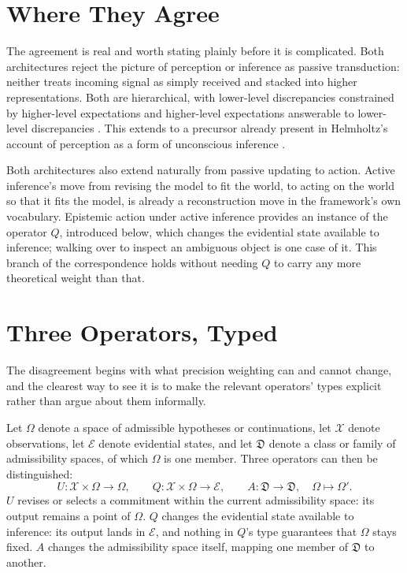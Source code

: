 \documentclass[11pt]{article}
\begin{document}
\section{Where They Agree}

The agreement is real and worth stating plainly before it is complicated. Both architectures reject the picture of perception or inference as passive transduction: neither treats incoming signal as simply received and stacked into higher representations. Both are hierarchical, with lower-level discrepancies constrained by higher-level expectations and higher-level expectations answerable to lower-level discrepancies \citep{friston2010,clark2013}. This extends to a precursor already present in Helmholtz's account of perception as a form of unconscious inference \citep{helmholtz1867}.

Both architectures also extend naturally from passive updating to action. Active inference's move from revising the model to fit the world, to acting on the world so that it fits the model, is already a reconstruction move in the framework's own vocabulary. Epistemic action under active inference provides an instance of the operator $Q$, introduced below, which changes the evidential state available to inference; walking over to inspect an ambiguous object is one case of it. This branch of the correspondence holds without needing $Q$ to carry any more theoretical weight than that.

\section{Three Operators, Typed}

The disagreement begins with what precision weighting can and cannot change, and the clearest way to see it is to make the relevant operators' types explicit rather than argue about them informally.

Let $\Omega$ denote a space of admissible hypotheses or continuations, let $\mathcal{X}$ denote observations, let $\mathcal{E}$ denote evidential states, and let $\mathfrak{D}$ denote a class or family of admissibility spaces, of which $\Omega$ is one member. Three operators can then be distinguished:
\[
U : \mathcal{X} \times \Omega \rightarrow \Omega, \qquad
Q : \mathcal{X} \times \Omega \rightarrow \mathcal{E}, \qquad
A : \mathfrak{D} \rightarrow \mathfrak{D}, \quad \Omega \mapsto \Omega'.
\]
$U$ revises or selects a commitment within the current admissibility space: its output remains a point of $\Omega$. $Q$ changes the evidential state available to inference: its output lands in $\mathcal{E}$, and nothing in $Q$'s type guarantees that $\Omega$ stays fixed. $A$ changes the admissibility space itself, mapping one member of $\mathfrak{D}$ to another.
\end{document}
